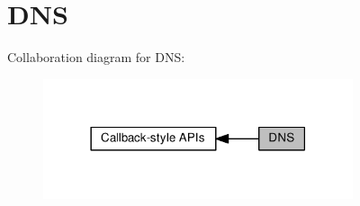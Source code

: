 \hypertarget{group__lwip__opts__dns}{}\section{D\+NS}
\label{group__lwip__opts__dns}
Collaboration diagram for D\+NS\+:
\nopagebreak
\begin{figure}[H]
\begin{center}
\leavevmode
\includegraphics[width=258pt]{group__lwip__opts__dns}
\end{center}
\end{figure}
